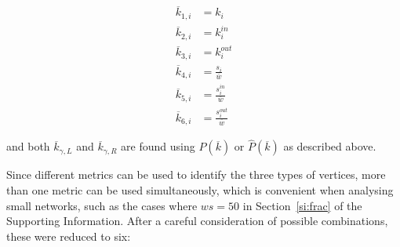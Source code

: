 \documentclass[%
	aip,
	jmp,%
	amsmath,amssymb,
	reprint,%
]{revtex4-1}
\begin{document}
\begin{equation}
	\begin{split}
		\overline{k}_{1,i}&=k_i \\
		\overline{k}_{2,i}&=k_i^{in} \\
		\overline{k}_{3,i}&=k_i^{out} \\
		\overline{k}_{4,i}&=\frac{s_i}{\overline{w}} \\
		\overline{k}_{5,i}&=\frac{s_i^{in}}{\overline{w}} \\
		\overline{k}_{6,i}&=\frac{s_i^{out}}{\overline{w}}
	\end{split}
\end{equation}

\noindent and both $\overline{k}_{\gamma,L}$ and $\overline{k}_{\gamma,R}$ are found using $P(\overline{k})$ or $\hat{P}(\overline{k})$ as described above.

Since different metrics can be used to identify the three types of vertices,
more than one metric can be used simultaneously, which is convenient when analysing 
small networks,
such as the cases where $ws=50$ in Section~\ref{si:frac} of the Supporting Information.
After a careful consideration of possible combinations, these were reduced to six:
\end{document}
